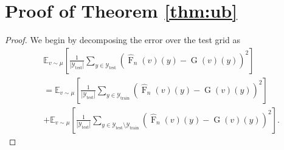 \documentclass[11pt]{article}
\theoremstyle{plain}
\begin{document}
\section{Proof of Theorem \ref{thm:ub}}\label{appdx:ub}
\begin{proof} 
We begin by decomposing the error over the test grid as
\begin{equation*}
\begin{split}
&\mathbb{E}_{v \sim \mu} \left[ \frac{1}{|\mathcal{Y}_{\mathrm{test}}|} \sum_{y \in \mathcal{Y}_{\mathrm{test}}} \left( \widehat{\operatorname{F}}_n(v)(y) - \operatorname{G}(v)(y) \right)^2 \right]\\
&= \mathbb{E}_{v \sim \mu} \left[ \frac{1}{|\mathcal{Y}_{\mathrm{test}}|} \sum_{y \in \mathcal{Y}_{\mathrm{train}}} \left( \widehat{\operatorname{F}}_n(v)(y) - \operatorname{G}(v)(y) \right)^2 \right] \quad \\
&+ \mathbb{E}_{v \sim \mu} \left[ \frac{1}{|\mathcal{Y}_{\mathrm{test}}|} \sum_{y \in \mathcal{Y}_{\mathrm{test}} \setminus \mathcal{Y}_{\mathrm{train}}} \left( \widehat{\operatorname{F}}_n(v)(y) - \operatorname{G}(v)(y) \right)^2 \right].
\end{split}
\end{equation*}


\end{proof}
\end{document}
